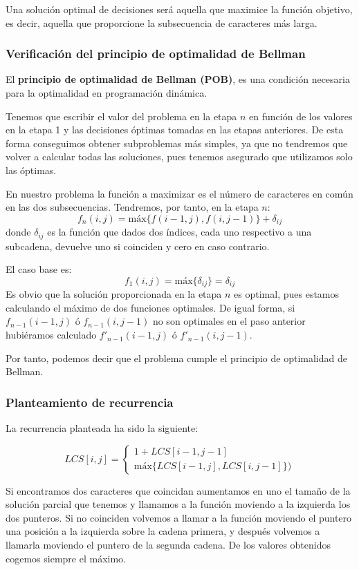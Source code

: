 \documentclass[10pt, a4paper]{article}
\theoremstyle{theorem-style}
\theoremstyle{theorem-style}
\theoremstyle{definition-style}
\theoremstyle{remark-style}
\theoremstyle{example-style}
\theoremstyle{definition-style}
\theoremstyle{remark-style}
\begin{document}
Una solución optimal de decisiones será aquella que maximice la función objetivo, es decir, aquella que proporcione la subsecuencia de caracteres más larga.

\subsubsection{Verificación del principio de optimalidad de Bellman}

El \textbf{principio de optimalidad de Bellman (POB)}, es una condición necesaria para la optimalidad en programación dinámica. 

Tenemos que escribir el valor del problema en la etapa $n$ en función de los valores en la etapa 1 y las decisiones óptimas tomadas en las etapas anteriores. De esta forma conseguimos obtener subproblemas más simples, ya que no tendremos que volver a calcular todas las soluciones, pues tenemos asegurado que utilizamos solo las óptimas.  
 
En nuestro problema la función a maximizar es el número de caracteres en común en las dos subsecuencias. Tendremos, por tanto, en la etapa $n$:
$$
	f_n(i,j) = \text{máx}\{f(i-1,j),f(i,j-1)\}+\delta_{ij}
$$
donde $\delta_{ij}$ es la función que dados dos índices, cada uno respectivo a una subcadena, devuelve uno si coinciden y cero en caso contrario.

El caso base es:
$$
	f_1(i,j) = \text{máx}\{\delta_{ij}\} = \delta_{ij}
$$
Es obvio que la solución proporcionada en la etapa $n$ es optimal, pues estamos calculando el máximo de dos funciones optimales. De igual forma, si $f_{n-1}(i-1,j)$ ó $f_{n-1}(i,j-1)$ no son optimales en el paso anterior hubiéramos calculado $f'_{n-1}(i-1,j)$ ó $f'_{n-1}(i,j-1)$.

Por tanto, podemos decir que el problema cumple el principio de optimalidad de Bellman. 

\subsubsection{Planteamiento de recurrencia}
La recurrencia planteada ha sido la siguiente:


$$ LCS{[i,j]}= \left\{\begin{matrix} 1+LCS[i-1,j-1] \\ \text{máx}\{LCS[i-1,j],LCS[i,j-1]\})\end{matrix}\right. $$

Si encontramos dos caracteres que coincidan aumentamos en uno el tamaño de la solución parcial que tenemos y llamamos a la función moviendo a la izquierda los dos punteros. Si no coinciden volvemos a llamar a la función moviendo el puntero una posición a la izquierda sobre la cadena primera, y después volvemos a llamarla moviendo el puntero de la segunda cadena. De los valores obtenidos cogemos siempre el máximo.
\end{document}
